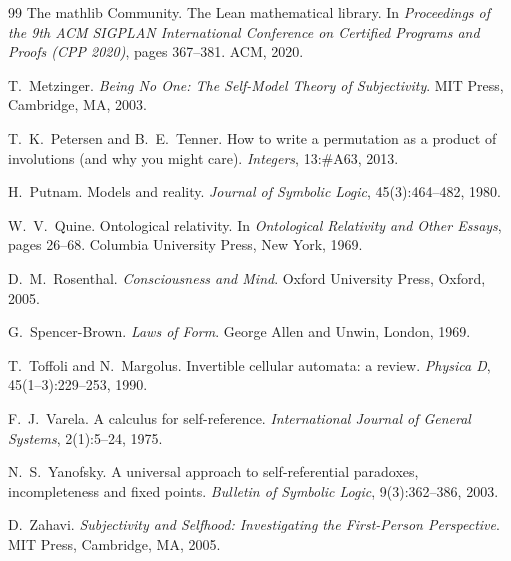 \documentclass[11pt,a4paper]{article}
\theoremstyle{plain}
\theoremstyle{definition}
\theoremstyle{remark}
\begin{document}
\begin{thebibliography}{99}
The mathlib Community.
\newblock The Lean mathematical library.
\newblock In \emph{Proceedings of the 9th ACM SIGPLAN International
  Conference on Certified Programs and Proofs (CPP 2020)}, pages
  367--381. ACM, 2020.

T.~Metzinger.
\newblock \emph{Being No One: The Self-Model Theory of Subjectivity}.
\newblock MIT Press, Cambridge, MA, 2003.

T.~K.~Petersen and B.~E.~Tenner.
\newblock How to write a permutation as a product of involutions (and why
  you might care).
\newblock \emph{Integers}, 13:\#A63, 2013.

H.~Putnam.
\newblock Models and reality.
\newblock \emph{Journal of Symbolic Logic}, 45(3):464--482, 1980.

W.~V.~Quine.
\newblock Ontological relativity.
\newblock In \emph{Ontological Relativity and Other Essays}, pages 26--68.
  Columbia University Press, New York, 1969.

D.~M.~Rosenthal.
\newblock \emph{Consciousness and Mind}.
\newblock Oxford University Press, Oxford, 2005.

G.~Spencer-Brown.
\newblock \emph{Laws of Form}.
\newblock George Allen and Unwin, London, 1969.

T.~Toffoli and N.~Margolus.
\newblock Invertible cellular automata: a review.
\newblock \emph{Physica D}, 45(1--3):229--253, 1990.

F.~J.~Varela.
\newblock A calculus for self-reference.
\newblock \emph{International Journal of General Systems}, 2(1):5--24,
  1975.

N.~S.~Yanofsky.
\newblock A universal approach to self-referential paradoxes,
  incompleteness and fixed points.
\newblock \emph{Bulletin of Symbolic Logic}, 9(3):362--386, 2003.

D.~Zahavi.
\newblock \emph{Subjectivity and Selfhood: Investigating the
  First-Person Perspective}.
\newblock MIT Press, Cambridge, MA, 2005.

\end{thebibliography}
\end{document}
